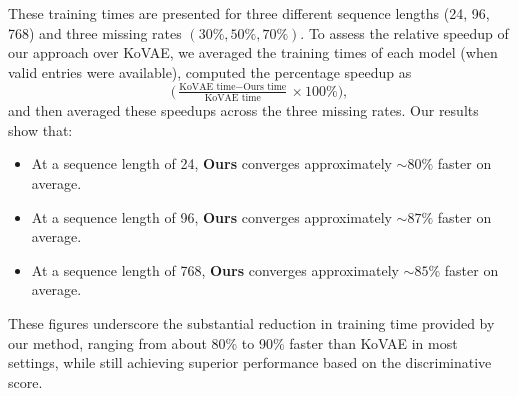 \documentclass{article}
\theoremstyle{plain}
\theoremstyle{definition}
\theoremstyle{remark}
\begin{document}
These training times are presented for three different sequence lengths (24, 96, 768) and three missing rates $(30\%, 50\%, 70\%)$. To assess the relative speedup of our approach over KoVAE, we averaged the training times of each model (when valid entries were available), computed the percentage speedup as 
\[
  \bigl(\tfrac{\text{KoVAE time} - \text{Ours time}}{\text{KoVAE time}} \times 100\%\bigr),
\]
and then averaged these speedups across the three missing rates. Our results show that:
\begin{itemize}
    \item At a sequence length of 24, \textbf{Ours} converges approximately \(\sim80\%\) faster on average.
    \item At a sequence length of 96, \textbf{Ours} converges approximately \(\sim87\%\) faster on average.
    \item At a sequence length of 768, \textbf{Ours} converges approximately \(\sim85\%\) faster on average.
\end{itemize}

These figures underscore the substantial reduction in training time provided by our method, ranging from about 80\% to 90\% faster than KoVAE in most settings, while still achieving superior performance based on the discriminative score. 
\end{document}

